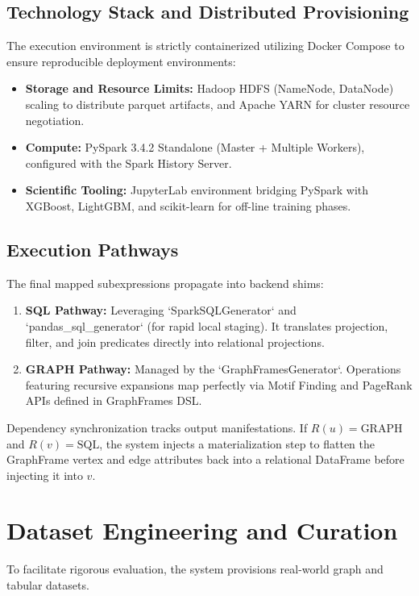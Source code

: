 \documentclass[conference]{IEEEtran}
\begin{document}
\subsection{Technology Stack and Distributed Provisioning}
The execution environment is strictly containerized utilizing Docker Compose to ensure reproducible deployment environments:
\begin{itemize}[leftmargin=*]
\item \textbf{Storage and Resource Limits:} Hadoop HDFS (NameNode, DataNode) scaling to distribute parquet artifacts, and Apache YARN for cluster resource negotiation.
\item \textbf{Compute:} PySpark 3.4.2 Standalone (Master + Multiple Workers), configured with the Spark History Server.
\item \textbf{Scientific Tooling:} JupyterLab environment bridging PySpark with XGBoost, LightGBM, and scikit-learn for off-line training phases.
\end{itemize}

\subsection{Execution Pathways}
The final mapped subexpressions propagate into backend shims:
\begin{enumerate}
    \item \textbf{SQL Pathway:} Leveraging `SparkSQLGenerator` and `pandas_sql_generator` (for rapid local staging). It translates projection, filter, and join predicates directly into relational projections.
    \item \textbf{GRAPH Pathway:} Managed by the `GraphFramesGenerator`. Operations featuring recursive expansions map perfectly via Motif Finding and PageRank APIs defined in GraphFrames DSL.
\end{enumerate}

Dependency synchronization tracks output manifestations. If $R(u)=\text{GRAPH}$ and $R(v)=\text{SQL}$, the system injects a materialization step to flatten the GraphFrame vertex and edge attributes back into a relational DataFrame before injecting it into $v$.

\section{Dataset Engineering and Curation}

To facilitate rigorous evaluation, the system provisions real-world graph and tabular datasets.
\end{document}
